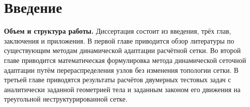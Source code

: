 \chapter*{Введение}                         %

\newcommand{\actuality}{}
\newcommand{\aim}{{\textbf\aimTXT}}
\newcommand{\tasks}{\textbf{\tasksTXT}}
\newcommand{\novelty}{\textbf{\noveltyTXT}}
\newcommand{\influence}{\textbf{\influenceTXT}}
\newcommand{\methods}{\textbf{\methodsTXT}}
\newcommand{\defpositions}{\textbf{\defpositionsTXT}}
\newcommand{\reliability}{\textbf{\reliabilityTXT}}
\newcommand{\probation}{\textbf{\probationTXT}}
\newcommand{\publications}{\textbf{\publicationsTXT}}


\textbf{Объем и структура работы.} Диссертация состоит из введения, трёх глав,
заключения и приложения. В первой главе приводится обзор литературы по существующим методам динамической адаптации расчётной сетки. Во второй главе приводится математическая формулировка метода динамической сеточной адаптации путём перераспределения узлов без изменения топологии сетки. В третьей главе приводятся результаты расчётов двумерных тестовых задач с аналитически заданной геометрией тела и заданным законом его движения на треугольной неструктурированной сетке. 





